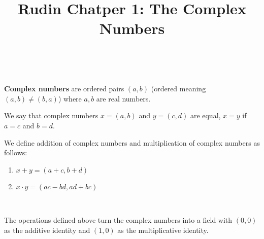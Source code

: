\documentclass{article}
\title{Rudin Chatper 1: The Complex Numbers}
\begin{document}
\maketitle

\begin{definition}
\

\textbf{Complex numbers} are ordered pairs $(a,b)$ (ordered meaning $(a,b) \neq (b,a)$) where $a,b$ are real numbers. 

We say that complex numbers $x = (a,b)$ and $y = (c,d)$ are equal, $x=y$ if $a=c$ and $b=d$. 

We define addition of complex numbers and multiplication of complex numbers as follows:

\begin{enumerate}
    \item $x+y = (a+c, b+d)$
    \item $x\cdot y = (ac-bd, ad+bc)$
\end{enumerate}
\end{definition}

\begin{theorem}
\

The operations defined above turn the complex numbers into a field with $(0,0)$ as the additive identity and $(1,0)$ as the multiplicative identity.
\end{theorem}
\end{document}
